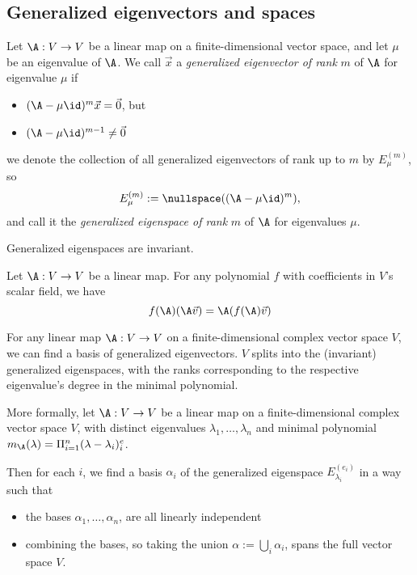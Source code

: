 \subsection{Generalized eigenvectors and spaces}
\begin{definition}
    Let $\A:V \to V$ be a linear map on a finite-dimensional vector space, and let $\mu$ be an eigenvalue of $\A$.
    We call $\vec{x}$ a \emph{generalized eigenvector of rank} $m$ of $\A$ for eigenvalue $\mu$ if
    \begin{itemize}
        \item $(\A - \mu \id)^m\vec{x} = \vec{0}$, but
        \item $(\A - \mu \id)^{m-1} \ne \vec{0}$
    \end{itemize}
    we denote the collection of all generalized eigenvectors of rank up to $m$ by $E_\mu^{(m)}$, so
    $$E_\mu^{(m)} := \nullspace((\A-\mu \id)^m),$$
    and call it the \emph{generalized eigenspace of rank} $m$ of $\A$ for eigenvalues $\mu$.
\end{definition}

\begin{theorem}
    Generalized eigenspaces are invariant.
\end{theorem}

\begin{theorem}
    Let $\A:V \to V$ be a linear map. For any polynomial $f$ with coefficients in $V$'s scalar field,
    we have
    $$f(\A)(\A\vec{v}) = \A(f(\A)\vec{v})$$
\end{theorem}

\begin{theorem}
    For any linear map $\A: V \to V$ on a finite-dimensional complex vector
    space $V$, we can find a basis of generalized eigenvectors. $V$ splits into
    the (invariant) generalized eigenspaces, with the ranks corresponding to
    the respective eigenvalue's degree in the minimal polynomial.

    More formally, let $\A: V \to V$ be a linear map on a finite-dimensional
    complex vector space $V$, with distinct eigenvalues
    $\lambda_1,\dots,\lambda_n$ and minimal polynomial $m_\A(\lambda) =
    \Pi_{i=1}^n(\lambda-\lambda_i)^e_i$.

    Then for each $i$, we find a basis $\alpha_i$ of the generalized eigenspace
    $E_{\lambda_i}^{(e_i)}$ in a way such that
    \begin{itemize}
        \item the bases $\alpha_1,\dots,\alpha_n$, are all linearly independent
        \item combining the bases, so taking the union $\alpha:=\bigcup_i\alpha_i$, spans the full vector
            space $V$.
    \end{itemize}
\end{theorem}

